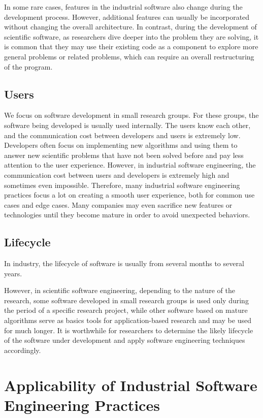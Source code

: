 In some rare cases, features in the industrial software also change during the development process.
However, additional features can usually be incorporated without changing the overall architecture.
In contrast, during the development of scientific software, as researchers dive deeper into the problem they are solving, it is common that they may use their existing code as a component to explore more general problems or related problems, which can require an overall restructuring of the program.

\subsection{Users}
We focus on software development in small research groups.
For these groups, the software being developed is usually used internally.
The users know each other, and the communication cost between developers and users is extremely low.
Developers often focus on implementing new algorithms and using them to answer new scientific problems that have not been solved before and pay less attention to the user experience.
However, in industrial software engineering, the communication cost between users and developers is extremely high and sometimes even impossible.
Therefore, many industrial software engineering practices focus a lot on creating a smooth user experience, both for common use cases and edge cases.
Many companies may even sacrifice new features or technologies until they become mature in order to avoid unexpected behaviors.

\subsection{Lifecycle}

In industry, the lifecycle of software is usually from several months to several years.

However, in scientific software engineering, depending to the nature of the research, some software developed in small research groups is used only during the period of a specific research project,
while other software based on mature algorithms serve as basics tools for application-based research and may be used for much longer.
It is worthwhile for researchers to determine the likely lifecycle of the software under development and apply software engineering techniques accordingly.

\section{Applicability of Industrial Software Engineering Practices}

